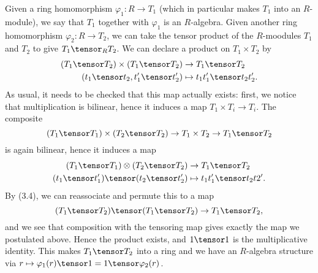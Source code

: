 Given a ring homomorphism $\varphi_1\colon R\to T_1$ (which in particular makes
$T_1$ into an $R$-module), we say that $T_1$ together with $\varphi_1$ is
an $R$-algebra. Given another ring homomorphism $\varphi_2\colon R\to T_2$,
we can take the tensor product of the $R$-moodules $T_1$ and $T_2$ to
give $T_1 \tensor_R T_2$. We can declare a product on $T_1\times T_2$ by
\begin{align*}
	(T_1\tensor T_2)\times(T_1\tensor T_2)&\to T_1\tensor T_2\\
	(t_1\tensor t_2, t_1'\tensor t_2') &\mapsto t_1t_1'\tensor t_2t_2'.
\end{align*}
As usual, it needs to be checked that this map actually exists:
first, we notice that multiplication is bilinear, hence it induces a
map $T_1\times T_i \to T_i$. The composite
\[ (T_1\tensor T_1)\times (T_2\tensor T_2) \to T_1\times T_2 \to T_1\tensor T_2 \]
is again bilinear, hence it induces a map
\begin{align*}
	(T_1\tensor T_1)\otimes (T_2\tensor T_2)&\to T_1\tensor T_2\\
	(t_1\tensor t_1')\tensor (t_2\tensor t_2') &\mapsto t_1t_1' \tensor t_2t2'.
\end{align*}
By (3.4), we can reassociate and permute this to a map
\[ (T_1\tensor T_2)\tensor (T_1\tensor T_2) \to T_1\tensor T_2, \]
and we see that composition with the tensoring map gives exactly the map
we postulated above. Hence the product exists, and $1\tensor 1$ is the
multiplicative identity. This makes $T_1\tensor T_2$ into a ring and we have
an $R$-algebra structure via $r\mapsto \varphi_1(r)\tensor 1 = 1\tensor\varphi_2(r)$.
